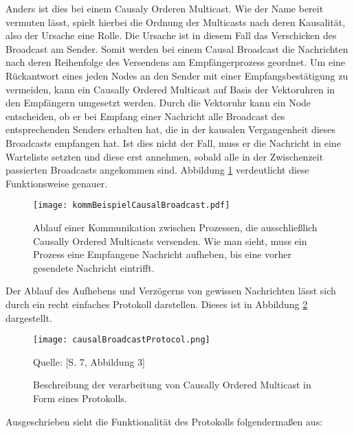 Anders ist dies bei einem Causaly Orderen Multicast. Wie der Name bereit vermuten lässt, spielt hierbei die Ordnung der Multicasts nach deren Kausalität, also der Ursache eine Rolle. Die Ursache ist in diesem Fall das Verschicken des Broadcast am Sender. Somit werden bei einem Causal Broadcast die Nachrichten nach deren Reihenfolge des Versendens am Empfängerprozess geordnet. Um eine Rückantwort eines jeden Nodes an den Sender mit einer Empfangsbestätigung zu vermeiden, kann ein Causally Ordered Multicast auf Basis der Vektoruhren in den Empfängern umgesetzt werden. Durch die Vektoruhr kann ein Node entscheiden, ob er bei Empfang einer Nachricht alle Broadcast des entsprechenden Senders erhalten hat, die in der kausalen Vergangenheit dieses Broadcasts empfangen hat. Ist dies nicht der Fall, muss er die Nachricht in eine Warteliste setzten und diese erst annehmen, sobald alle in der Zwischenzeit passierten Broadcasts angekommen sind. Abbildung \ref{figure:causalbroadcast} verdeutlicht diese Funktionsweise genauer.

\begin{figure}[ht]
	\centering
	\texttt{[image: kommBeispielCausalBroadcast.pdf]}
	\caption[Kommunikation durch Causally Ordered Multicasts]{Ablauf einer Kommunikation zwischen Prozessen, die ausschließlich Causally Ordered Multicasts versenden. Wie man sieht, muss ein Prozess eine Empfangene Nachricht aufheben, bis eine vorher gesendete Nachricht eintrifft.}
	\label{figure:causalbroadcast}
\end{figure}
\FloatBarrier

Der Ablauf des Aufhebens und Verzögerns von gewissen Nachrichten lässt sich durch ein recht einfaches Protokoll darstellen. Dieses ist in Abbildung \ref{figure:causalBroadcastProtocol} dargestellt.

\begin{figure}[ht]
	\centering
	\texttt{[image: causalBroadcastProtocol.png]}
	\caption[Protokoll für den Causally Ordered Multicast]{Beschreibung der verarbeitung von Causally Ordered Multicast in Form eines Protokolls.}
	Quelle: \cite{Baldoni:2002:FDC:1435723.1437765}[S. 7, Abbildung 3]
	\label{figure:causalBroadcastProtocol}
\end{figure}
\FloatBarrier

Ausgeschrieben sieht die Funktionalität des Protokolls folgendermaßen aus:

